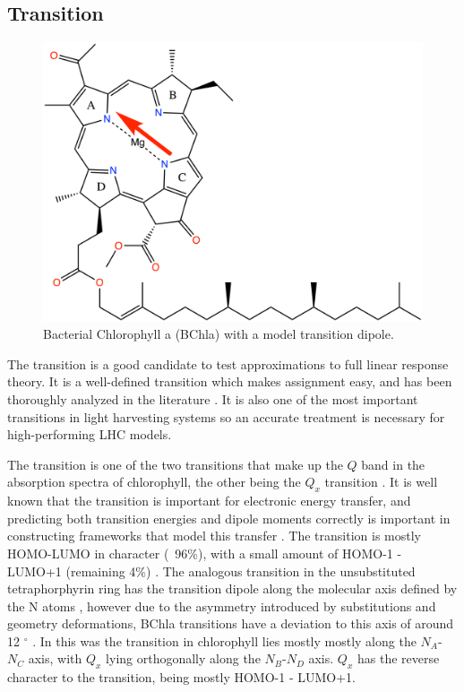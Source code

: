 \subsection{\Qy Transition}
\label{subsec:qy_transition}
\begin{figure}
    \centering
    \includegraphics{chapters/4_chl_xtb/chlorophyll_Qy.png}
    \caption{Bacterial Chlorophyll a (BChla) with a model \Qy transition dipole.}
    \label{fig:bchla_qy}
\end{figure}

The \Qy transition is a good candidate to test approximations to full linear response 
theory. It is a well-defined transition which makes assignment easy, and has been
thoroughly analyzed in the literature \cite{Strain1963, BelenOviedo2011, Zucchelli2002, Kim2020, Sirohiwal2020}. 
It is also one of the most important transitions in light harvesting systems so 
an accurate treatment is necessary for high-performing LHC models.

The \Qy transition is one of the two transitions that make up the $Q$ band in the
absorption spectra of chlorophyll, the other being the $Q_x$ transition \cite{Sirohiwal2020}.
It is well known that the \Qy transition is important for electronic energy transfer, 
and predicting both transition energies and dipole moments correctly is important 
in constructing  frameworks that model this transfer \cite{Zazubovich2001}. The
\Qy transition is mostly HOMO-LUMO in character (~96\%), with a small amount of 
HOMO-1 - LUMO+1 (remaining 4\%) \cite{Saito2020}. The analogous transition in the 
unsubstituted tetraphorphyrin ring has the transition dipole along the molecular
axis defined by the N atoms \cite{Fragata1988}, however due to the asymmetry introduced
by substitutions and geometry deformations, BChla \Qy transitions have a deviation
to this axis of around 12 $^{\circ}$ \cite{BelenOviedo2011}. In this was the \Qy
transition in chlorophyll lies mostly mostly along the $N_A$-$N_C$ axis, with $Q_x$
lying orthogonally along the $N_B$-$N_D$ axis. $Q_x$ has the reverse character to
the \Qy transition, being mostly HOMO-1 - LUMO+1.

